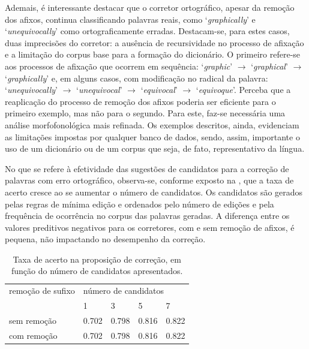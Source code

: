 \documentclass{textolivre}
\begin{document}
Ademais, é interessante destacar que o corretor ortográfico, apesar da
remoção dos afixos, continua classificando 
palavras reais, como `\textit{graphically}' e `\textit{unequivocally}' como ortograficamente
erradas. Destacam-se, para estes casos, duas imprecisões do corretor: a
ausência de recursividade no processo de afixação e a
limitação do corpus base para a formação do dicionário. O primeiro refere-se aos
processos de afixação que
ocorrem em sequência: `\textit{graphic}' $\rightarrow$ `\textit{graphical}' $\rightarrow$ `\textit{graphically}' e, em
alguns casos, com modificação no radical da palavra: `\textit{unequivocally}' $\rightarrow$
`\textit{unequivocal}' $\rightarrow$ `\textit{equivocal}' $\rightarrow$ `\textit{equivoque}'.  Perceba que a reaplicação
do processo de remoção dos afixos poderia ser eficiente para o primeiro 
exemplo, mas não para o segundo. Para este, faz-se necessária uma análise
morfofonológica mais refinada. Os exemplos descritos, ainda, evidenciam 
as limitações impostas por qualquer banco de dados, sendo, assim, importante
o uso de um dicionário ou de um corpus que seja, de fato, representativo da
língua.

No que se refere à efetividade das sugestões de candidatos para a
correção de palavras com erro ortográfico, observa-se, conforme exposto
na , que a taxa de acerto cresce ao se aumentar o
número de candidatos.
Os candidatos são gerados pelas regras de mínima edição e ordenados
pelo número de edições e pela frequência 
de ocorrência no corpus das palavras geradas.
A diferença entre os valores preditivos negativos para os corretores,
com e sem remoção de afixos, é pequena, não impactando no
desempenho da correção.

\begin{table}[htbp]
\centering
\caption{Taxa de acerto na proposição de correção, em função do número de candidatos apresentados.}
\label{tab-corate}
\begin{tabular}{lllll}
\toprule
remoção de sufixo & \multicolumn{4}{l}{número de candidatos} \\
                & 1        & 3        & 5        & 7       \\
\midrule
sem remoção     & 0.702   & 0.798   & 0.816   & 0.822  \\
com remoção     & 0.702   & 0.798   & 0.816   & 0.822  \\
\bottomrule
\end{tabular}
\end{table}
\end{document}
